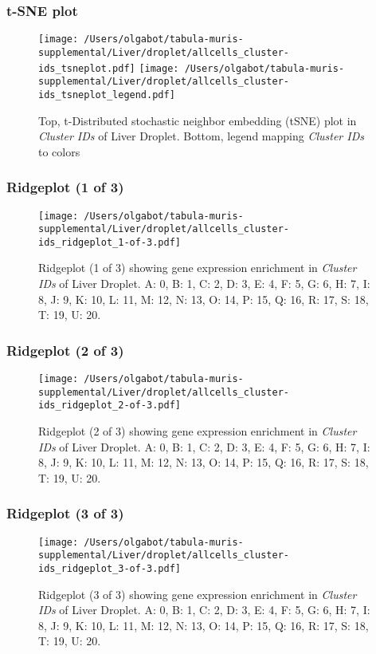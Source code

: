 \clearpage
\subsubsection{t-SNE plot}
\begin{figure}[h]
\centering
\texttt{[image: /Users/olgabot/tabula-muris-supplemental/Liver/droplet/allcells\_cluster-ids\_tsneplot.pdf]}
\texttt{[image: /Users/olgabot/tabula-muris-supplemental/Liver/droplet/allcells\_cluster-ids\_tsneplot\_legend.pdf]}
\caption{Top, t-Distributed stochastic neighbor embedding (tSNE) plot  in \emph{Cluster IDs} of Liver Droplet. Bottom, legend mapping \emph{Cluster IDs} to colors}
\end{figure}


\clearpage

\subsubsection{Ridgeplot (1 of 3)}
\begin{figure}[h]
\centering
\texttt{[image: /Users/olgabot/tabula-muris-supplemental/Liver/droplet/allcells\_cluster-ids\_ridgeplot\_1-of-3.pdf]}

\caption{ Ridgeplot (1 of 3)  showing gene expression enrichment in \emph{Cluster IDs} of Liver Droplet. A: 0, B: 1, C: 2, D: 3, E: 4, F: 5, G: 6, H: 7, I: 8, J: 9, K: 10, L: 11, M: 12, N: 13, O: 14, P: 15, Q: 16, R: 17, S: 18, T: 19, U: 20.}
\end{figure}


\clearpage

\subsubsection{Ridgeplot (2 of 3)}
\begin{figure}[h]
\centering
\texttt{[image: /Users/olgabot/tabula-muris-supplemental/Liver/droplet/allcells\_cluster-ids\_ridgeplot\_2-of-3.pdf]}

\caption{ Ridgeplot (2 of 3)  showing gene expression enrichment in \emph{Cluster IDs} of Liver Droplet. A: 0, B: 1, C: 2, D: 3, E: 4, F: 5, G: 6, H: 7, I: 8, J: 9, K: 10, L: 11, M: 12, N: 13, O: 14, P: 15, Q: 16, R: 17, S: 18, T: 19, U: 20.}
\end{figure}


\clearpage

\subsubsection{Ridgeplot (3 of 3)}
\begin{figure}[h]
\centering
\texttt{[image: /Users/olgabot/tabula-muris-supplemental/Liver/droplet/allcells\_cluster-ids\_ridgeplot\_3-of-3.pdf]}

\caption{ Ridgeplot (3 of 3)  showing gene expression enrichment in \emph{Cluster IDs} of Liver Droplet. A: 0, B: 1, C: 2, D: 3, E: 4, F: 5, G: 6, H: 7, I: 8, J: 9, K: 10, L: 11, M: 12, N: 13, O: 14, P: 15, Q: 16, R: 17, S: 18, T: 19, U: 20.}
\end{figure}


